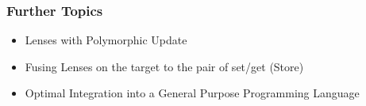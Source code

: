 \begin{frame}
\frametitle{Further Topics}

\begin{itemize}
\item Lenses with Polymorphic Update
\item Fusing Lenses on the target to the pair of set/get (Store)
\item Optimal Integration into a General Purpose Programming Language
\end{itemize}

\end{frame}

